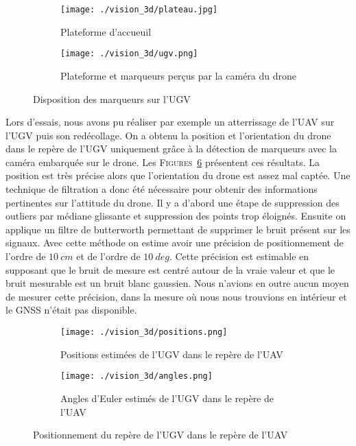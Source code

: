     \begin{figure}[!htb]
        \centering
        \begin{subfigure}[b]{0.35\textwidth}
            \centering
            \texttt{[image: ./vision\_3d/plateau.jpg]}
            \caption{Plateforme d'accueuil}
            \label{fig:plateforme}
        \end{subfigure}
        \hfill
        \begin{subfigure}[b]{0.55\textwidth}
            \centering
            \texttt{[image: ./vision\_3d/ugv.png]}
            \caption{Plateforme et marqueurs perçus par la caméra du drone}
            \label{fig:ugv}
        \end{subfigure}
        \caption{Disposition des marqueurs sur l'UGV}
        \label{fig:marqueurs_ugv}
    \end{figure}

    Lors d’essais, nous avons pu réaliser par exemple un atterrissage de l’UAV sur l’UGV puis son redécollage. On a obtenu la position et l’orientation du drone dans le repère de l’UGV uniquement grâce à la détection de marqueurs avec la caméra embarquée sur le drone. Les \textsc{Figures}~\ref{fig:results} présentent ces résultats. La position est très précise alors que l’orientation du drone est assez mal captée. Une technique de filtration a donc été nécessaire pour obtenir des informations pertinentes sur l’attitude du drone. Il y a d’abord une étape de suppression des outliers par médiane glissante et suppression des points trop éloignés. Ensuite on applique un filtre de butterworth permettant de supprimer le bruit présent sur les signaux. Avec cette méthode on estime avoir une précision de positionnement de l'ordre de $10\ cm$ et de l'ordre de $10\ deg$. Cette précision est estimable en supposant que le bruit de mesure est centré autour de la vraie valeur et que le bruit mesurable est un bruit blanc gaussien. Nous n'avions en outre aucun moyen de mesurer cette précision, dans la mesure où nous nous trouvions en intérieur et le GNSS n'était pas disponible.

    \begin{figure}[!htb]
        \centering
        \begin{subfigure}[b]{0.45\textwidth}
            \centering
            \texttt{[image: ./vision\_3d/positions.png]}
            \caption{Positions estimées de l'UGV dans le repère de l'UAV}
            \label{fig:plateforme}
        \end{subfigure}
        \hfill
        \begin{subfigure}[b]{0.45\textwidth}
            \centering
            \texttt{[image: ./vision\_3d/angles.png]}
            \caption{Angles d'Euler estimés de l'UGV dans le repère de l'UAV}
            \label{fig:ugv}
        \end{subfigure}
        \caption{Positionnement du repère de l'UGV dans le repère de l'UAV}
        \label{fig:results}
    \end{figure}
